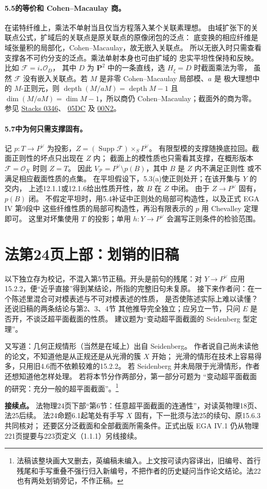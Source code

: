 \documentclass[openany,fontset=fandol]{ctexbook}
\DeclareMathOperator{\Supp}{Supp}
\DeclareMathOperator{\depth}{depth}
\newcommand{\OO}{\mathcal O}
\newcommand{\FF}{\mathcal F}
\newcommand{\calP}{\mathcal P}
\begin{document}
\paragraph{5.5的等价和 Cohen--Macaulay 商。}
在诺特纤维上，乘法不单射当且仅当方程落入某个关联素理想。
由域扩张下的关联点公式，扩域后的关联点是原关联点的原像闭包的泛点：
底变换的相应纤维是域张量积的局部化，Cohen--Macaulay，故无嵌入关联点。
所以无嵌入时只需查看支撑各不可约分支的泛点。乘法单射本身也可由扩域的
忠实平坦性保持和反映。比如 $\FF=i_*\OO_D$，
其中 $D$ 为 $\mathbf P^2$ 中的一条直线，选 $H_\xi=D$ 时截面乘法为零，
虽然 $\FF$ 没有嵌入关联点。若 $M$ 是非零 Cohen--Macaulay 局部模、$a$ 是
极大理想中的 $M$-正则元，则 $\depth(M/aM)=\depth M-1$ 且
$\dim(M/aM)=\dim M-1$，所以商仍 Cohen--Macaulay；截面外的商为零。
参见 \href{https://stacks.math.columbia.edu/tag/0346}{Stacks 0346}、
\href{https://stacks.math.columbia.edu/tag/05DC}{05DC} 及
\href{https://stacks.math.columbia.edu/tag/00N2}{00N2}。

\paragraph{5.7中为何只需支撑固有。}
记 $p:T\to P^\vee$ 为投影，$Z=(\Supp\FF)\times_S P^\vee$。
有限型模的支撑随换底拉回。截面正则性的坏点只出现在 $Z$ 内；
截面上的模性质也只需看其支撑，在概形版本 $\FF=\OO_X$ 时则 $Z=T$。
因此 $V_{\calP}=P^\vee\setminus p(B)$，其中 $B$ 是 $Z$ 内不满足正则性
或不满足相应截面性质的点集。
在平坦假设下，5.3(a)使正则处开；在该开集与 $Y$ 的交内，
上述12.1.1或12.1.6给出性质开性，故 $B$ 在 $Z$ 中闭。
由于 $Z\to P^\vee$ 固有，$p(B)$ 闭。
不假定平坦时，用5.4补证中正则处的局部可构造性，以及正式 EGA IV 第9段中
这些纤维性质的局部可构造性，再沿有限表示的 $p$ 用 Chevalley 定理即可。
这里对坏集使用 $T$ 的投影；单用 $h:Y\to P^\vee$ 会漏写正则条件的检验范围。

\clearpage
\section*{法第24页上部：划销的旧稿}
以下独立存为校记，不混入第5节正稿。开头是前句的残尾：对
$Y\to P^\vee$ 应用15.2.2，便“近乎直接”得到某结论，所指的完整旧句未复原。
接下来作者问：在一个陈述里混合可对模表述与不可对模表述的性质，
是否使陈述实际上难以读懂？还说旧稿的两条结论与第2、3、4节
其他推导完全独立；应另立一节，只问 $E$ 是否开，不谈泛超平面截面的性质。
建议题为“变动超平面截面的 Seidenberg 型定理”。

又写道：几何正规情形（当然是在域上）出自 Seidenberg。
作者说自己尚未读他的论文，不知道他是从正规还是从光滑的簇 $X$ 开始；
光滑的情形在技术上容易得多，只用旧4.6而不依赖较难的15.2.2。
若 Seidenberg 并未局限于光滑情形，作者还想知道他怎样处理。
若将本节分作两部分，第一部分可题为
“变动超平面截面的研究：充分一般的超平面截面”。\footnote{法稿该整块画大叉删去，英编稿未编入。上文按可读内容译出，旧编号、首行残尾和手写重叠不强行归入新编号，不把作者的历史疑问当作论文结论。法22也有两处划销旁记，不作正稿。}

\medskip
\noindent\textbf{接续点。}
法物理24页下部“第6节：任意超平面截面的连通性”，对读英物理18页、法25后续。
法24命题6.1起笔处有手写 $X$ 固有，下一批须与法25的续句、原15.6.3共同核对；
还要区分泛截面和全部截面所需条件。正式出版 EGA IV.1 仍从物理221页提要与223页定义（1.1.1）另线接续。
\end{document}
